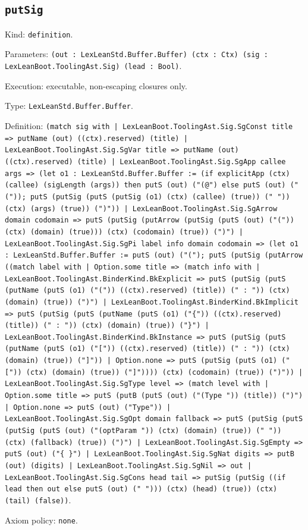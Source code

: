 \documentclass[11pt]{article}
\begin{document}
\subsection*{\texttt{putSig}}
\noindent Kind: \texttt{definition}.\par
\noindent Parameters: \texttt{(out : LexLeanStd.Buffer.Buffer) (ctx : Ctx) (sig : LexLeanBoot.ToolingAst.Sig) (lead : Bool)}.\par
\noindent Execution: executable, non-escaping closures only.\par
\noindent Type: \texttt{LexLeanStd.Buffer.Buffer}.\par
\noindent Definition: \texttt{(match sig with | LexLeanBoot.ToolingAst.Sig.SgConst title => putName (out) ((ctx).reserved) (title) | LexLeanBoot.ToolingAst.Sig.SgVar title => putName (out) ((ctx).reserved) (title) | LexLeanBoot.ToolingAst.Sig.SgApp callee args => (let o1 : LexLeanStd.Buffer.Buffer := (if explicitApp (ctx) (callee) (sigLength (args)) then putS (out) ("(@") else putS (out) ("(")); putS (putSig (putS (putSig (o1) (ctx) (callee) (true)) (" ")) (ctx) (args) (true)) (")")) | LexLeanBoot.ToolingAst.Sig.SgArrow domain codomain => putS (putSig (putArrow (putSig (putS (out) ("(")) (ctx) (domain) (true))) (ctx) (codomain) (true)) (")") | LexLeanBoot.ToolingAst.Sig.SgPi label info domain codomain => (let o1 : LexLeanStd.Buffer.Buffer := putS (out) ("("); putS (putSig (putArrow ((match label with | Option.some title => (match info with | LexLeanBoot.ToolingAst.BinderKind.BkExplicit => putS (putSig (putS (putName (putS (o1) ("(")) ((ctx).reserved) (title)) (" : ")) (ctx) (domain) (true)) (")") | LexLeanBoot.ToolingAst.BinderKind.BkImplicit => putS (putSig (putS (putName (putS (o1) ("\{")) ((ctx).reserved) (title)) (" : ")) (ctx) (domain) (true)) ("\}") | LexLeanBoot.ToolingAst.BinderKind.BkInstance => putS (putSig (putS (putName (putS (o1) ("[")) ((ctx).reserved) (title)) (" : ")) (ctx) (domain) (true)) ("]")) | Option.none => putS (putSig (putS (o1) ("[")) (ctx) (domain) (true)) ("]")))) (ctx) (codomain) (true)) (")")) | LexLeanBoot.ToolingAst.Sig.SgType level => (match level with | Option.some title => putS (putB (putS (out) ("(Type ")) (title)) (")") | Option.none => putS (out) ("Type")) | LexLeanBoot.ToolingAst.Sig.SgOpt domain fallback => putS (putSig (putS (putSig (putS (out) ("(optParam ")) (ctx) (domain) (true)) (" ")) (ctx) (fallback) (true)) (")") | LexLeanBoot.ToolingAst.Sig.SgEmpty => putS (out) ("\{ \}") | LexLeanBoot.ToolingAst.Sig.SgNat digits => putB (out) (digits) | LexLeanBoot.ToolingAst.Sig.SgNil => out | LexLeanBoot.ToolingAst.Sig.SgCons head tail => putSig (putSig ((if lead then out else putS (out) (" "))) (ctx) (head) (true)) (ctx) (tail) (false))}.\par
\noindent Axiom policy: \texttt{none}.\par
\end{document}
